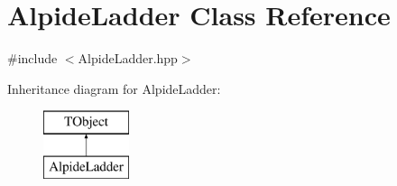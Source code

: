 \hypertarget{class_alpide_ladder}{}\section{Alpide\+Ladder Class Reference}
\label{class_alpide_ladder}


{\ttfamily \#include $<$Alpide\+Ladder.\+hpp$>$}

Inheritance diagram for Alpide\+Ladder\+:\begin{figure}[H]
\begin{center}
\leavevmode
\includegraphics[height=2.000000cm]{class_alpide_ladder}
\end{center}
\end{figure}
